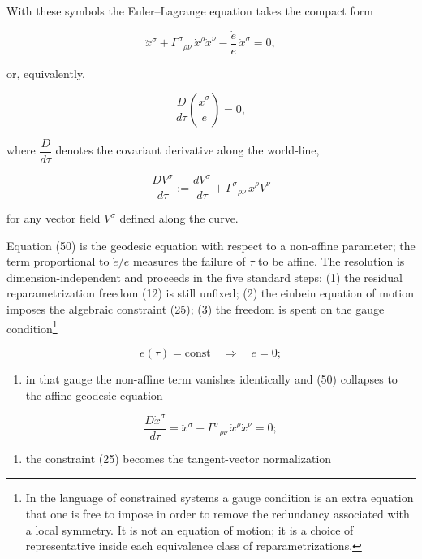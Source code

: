 \documentclass[
]{article}
\providecommand{\tightlist}{%
  \setlength{\itemsep}{0pt}\setlength{\parskip}{0pt}}
\begin{document}
With these symbols the Euler--Lagrange equation takes the compact form

\[\ddot{x}^{\sigma} + \Gamma^{\sigma}{}_{\rho\nu}\, \dot{x}^{\rho} \dot{x}^{\nu} - \frac{\dot{e}}{e}\, \dot{x}^{\sigma} = 0, \tag{50}\]

or, equivalently,

\[\frac{D}{d\tau} \left( \frac{\dot{x}^{\sigma}}{e} \right) = 0, \tag{51}\]

where \(\dfrac{D}{d\tau}\) denotes the covariant derivative along the
world-line,

\[\frac{D V^{\sigma}}{d\tau} := \frac{d V^{\sigma}}{d\tau} + \Gamma^{\sigma}{}_{\rho\nu}\, \dot{x}^{\rho} V^{\nu} \tag{52}\]

for any vector field \(V^{\sigma}\) defined along the curve.

Equation (50) is the geodesic equation with respect to a non-affine
parameter; the term proportional to \(\dot{e}/e\) measures the failure
of \(\tau\) to be affine. The resolution is dimension-independent and
proceeds in the five standard steps: (1) the residual reparametrization
freedom (12) is still unfixed; (2) the einbein equation of motion
imposes the algebraic constraint (25); (3) the freedom is spent on the
gauge condition\footnote{In the language of constrained systems a gauge
  condition is an extra equation that one is free to impose in order to
  remove the redundancy associated with a local symmetry. It is not an
  equation of motion; it is a choice of representative inside each
  equivalence class of reparametrizations.}

\[e(\tau) = \mathrm{const} \quad \Longrightarrow \quad \dot{e} = 0; \tag{53}\]

\begin{enumerate}
\def\labelenumi{(\arabic{enumi})}
\setcounter{enumi}{3}
\tightlist
\item
  in that gauge the non-affine term vanishes identically and (50)
  collapses to the affine geodesic equation
\end{enumerate}

\[\frac{D \dot{x}^{\sigma}}{d\tau} = \ddot{x}^{\sigma} + \Gamma^{\sigma}{}_{\rho\nu}\, \dot{x}^{\rho} \dot{x}^{\nu} = 0; \tag{54}\]

\begin{enumerate}
\def\labelenumi{(\arabic{enumi})}
\setcounter{enumi}{4}
\tightlist
\item
  the constraint (25) becomes the tangent-vector normalization
\end{enumerate}
\end{document}
